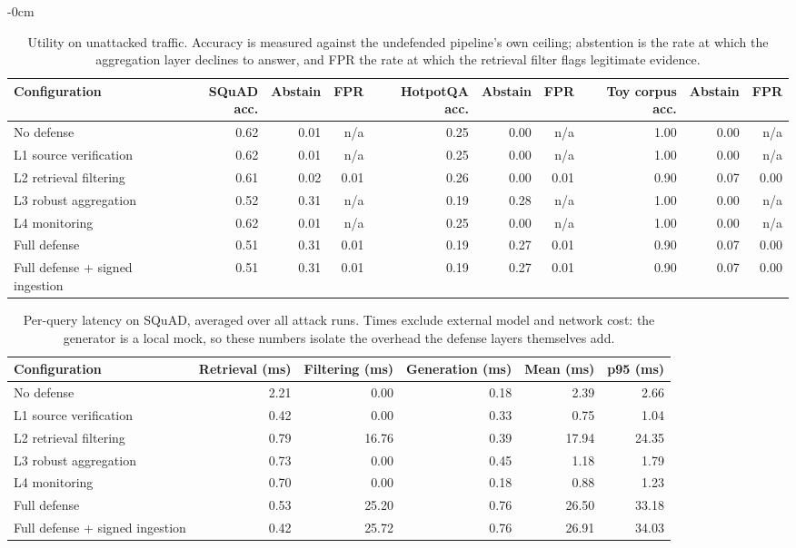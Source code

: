 \documentclass[information,article,submit,moreauthors]{Definitions/mdpi}
\begin{document}
\begin{table}[H]
\begin{adjustwidth}{-\extralength}{0cm}
\footnotesize
\caption{Utility on unattacked traffic. Accuracy is measured against the undefended pipeline's own ceiling; abstention is the rate at which the aggregation layer declines to answer, and FPR the rate at which the retrieval filter flags legitimate evidence.\label{tab:utility}}
\begin{tabular}{lrrrrrrrrr}
\toprule
\textbf{Configuration} & \textbf{SQuAD acc.} & \textbf{Abstain} & \textbf{FPR} & \textbf{HotpotQA acc.} & \textbf{Abstain} & \textbf{FPR} & \textbf{Toy corpus acc.} & \textbf{Abstain} & \textbf{FPR}\\
\midrule
No defense & 0.62 & 0.01 & n/a & 0.25 & 0.00 & n/a & 1.00 & 0.00 & n/a\\
L1 source verification & 0.62 & 0.01 & n/a & 0.25 & 0.00 & n/a & 1.00 & 0.00 & n/a\\
L2 retrieval filtering & 0.61 & 0.02 & 0.01 & 0.26 & 0.00 & 0.01 & 0.90 & 0.07 & 0.00\\
L3 robust aggregation & 0.52 & 0.31 & n/a & 0.19 & 0.28 & n/a & 1.00 & 0.00 & n/a\\
L4 monitoring & 0.62 & 0.01 & n/a & 0.25 & 0.00 & n/a & 1.00 & 0.00 & n/a\\
Full defense & 0.51 & 0.31 & 0.01 & 0.19 & 0.27 & 0.01 & 0.90 & 0.07 & 0.00\\
Full defense + signed ingestion & 0.51 & 0.31 & 0.01 & 0.19 & 0.27 & 0.01 & 0.90 & 0.07 & 0.00\\
\bottomrule
\end{tabular}
\end{adjustwidth}
\end{table}
\begin{table}[H]
\small
\caption{Per-query latency on SQuAD, averaged over all attack runs. Times exclude external model and network cost: the generator is a local mock, so these numbers isolate the overhead the defense layers themselves add.\label{tab:latency}}
\begin{tabular}{lrrrrr}
\toprule
\textbf{Configuration} & \textbf{Retrieval (ms)} & \textbf{Filtering (ms)} & \textbf{Generation (ms)} & \textbf{Mean (ms)} & \textbf{p95 (ms)}\\
\midrule
No defense & 2.21 & 0.00 & 0.18 & 2.39 & 2.66\\
L1 source verification & 0.42 & 0.00 & 0.33 & 0.75 & 1.04\\
L2 retrieval filtering & 0.79 & 16.76 & 0.39 & 17.94 & 24.35\\
L3 robust aggregation & 0.73 & 0.00 & 0.45 & 1.18 & 1.79\\
L4 monitoring & 0.70 & 0.00 & 0.18 & 0.88 & 1.23\\
Full defense & 0.53 & 25.20 & 0.76 & 26.50 & 33.18\\
Full defense + signed ingestion & 0.42 & 25.72 & 0.76 & 26.91 & 34.03\\
\bottomrule
\end{tabular}
\end{table}
\end{document}

